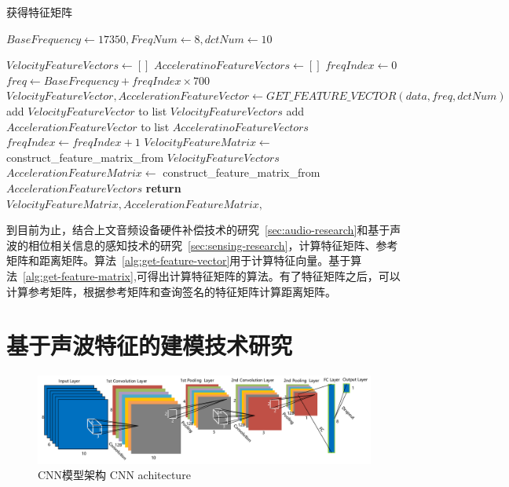 \begin{algorithm}[!htp]
\caption{获得特征矩阵}
\label{alg:get-feature-matrix}
\begin{algorithmic}[1]
 
\State $BaseFrequency \gets 17350, FreqNum \gets 8, dctNum \gets 10$ 

\State $VelocityFeatureVectors \gets []$  
\State $AcceleratinoFeatureVectors \gets []$ 
\State $freqIndex \gets 0$ 
 
\State $freq \gets BaseFrequency + freqIndex\times 700$
\State $VelocityFeatureVector,AccelerationFeatureVector \gets  GET\_FEATURE\_VECTOR(data, freq, dctNum)$
\State add $VelocityFeatureVector$ to list $VelocityFeatureVectors$ 
\State add $AccelerationFeatureVector$ to list $AcceleratinoFeatureVectors$ 
\State $freqIndex \gets freqIndex + 1$
\EndWhile\label{euclidendwhile}
\State $VelocityFeatureMatrix \gets$ construct\_feature\_matrix\_from $VelocityFeatureVectors$ 
\State $AccelerationFeatureMatrix \gets$ construct\_feature\_matrix\_from $AccelerationFeatureVectors$ 
\State \textbf{return} $VelocityFeatureMatrix,AccelerationFeatureMatrix,$
\EndProcedure
\end{algorithmic}
\end{algorithm}

到目前为止，结合上文音频设备硬件补偿技术的研究~\ref{sec:audio-research}和基于声波的相位相关信息的感知技术的研究~\ref{sec:sensing-research}，计算特征矩阵、参考矩阵和距离矩阵。算法~\ref{alg:get-feature-vector}用于计算特征向量。基于算法~\ref{alg:get-feature-matrix},可得出计算特征矩阵的算法。有了特征矩阵之后，可以计算参考矩阵，根据参考矩阵和查询签名的特征矩阵计算距离矩阵。

\section{基于声波特征的建模技术研究}

\begin{figure}[!htp]
  \centering
  \includegraphics[width=\textwidth]{figure/cnn-architecture.pdf}
  \bicaption
    {CNN模型架构}
    {CNN achitecture}
  \label{fig:cnn-architecture}
\end{figure}

